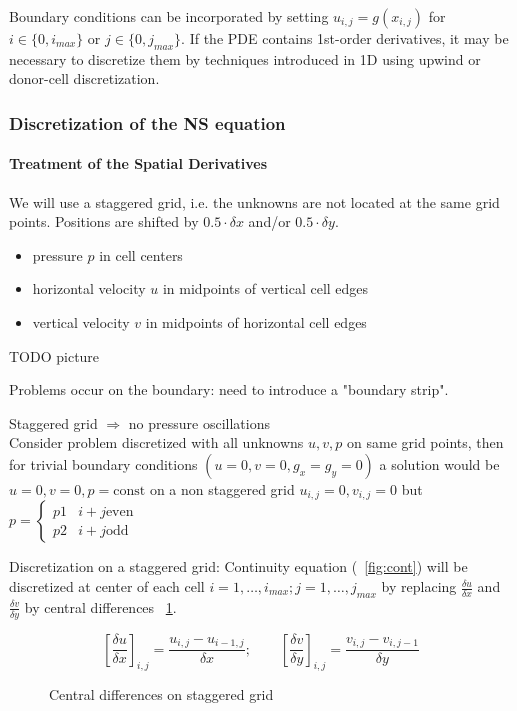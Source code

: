 Boundary conditions can be incorporated by setting $u_{i,j} = g(x_{i,j})$ for $i \in \lbrace 0, i_{max} \rbrace$ or $j \in \lbrace 0,j_{max} \rbrace$. If the PDE contains 1st-order derivatives, it may be necessary to discretize them by techniques introduced in 1D using upwind or donor-cell discretization.

\subsubsection{Discretization of the NS equation}
\paragraph{Treatment of the Spatial Derivatives}
We will use a staggered grid, i.e. the unknowns are not located at the same grid points. Positions are shifted by $0.5 \cdot \delta x$ and/or $0.5 \cdot \delta y$.
\begin{itemize}
	\item pressure $p$ in cell centers
	\item horizontal velocity $u$ in midpoints of vertical cell edges
	\item vertical velocity $v$ in midpoints of horizontal cell edges
\end{itemize}
TODO picture


Problems occur on the boundary: need to introduce a "boundary strip".

Staggered grid $\Rightarrow$ no pressure oscillations\\
Consider problem discretized with all unknowns $u,v,p$ on same grid points, then for trivial boundary conditions $(u = 0, v =0, g_x = g_y = 0)$ a solution would be $u = 0, v = 0, p = \text{const}$ on a non staggered grid $u_{i,j} = 0, v_{i,j} = 0$ but $p = \begin{cases}
p1 & i+j \text{even}\\
p2 & i+j \text{odd}
\end{cases}$

Discretization on a staggered grid: Continuity equation (~\ref{fig:cont}) will be discretized at center of each cell $i = 1, \dots, i_{max}; j = 1, \dots, j_{max}$ by replacing $\frac{\delta u}{\delta x}$ and $\frac{\delta v}{\delta y}$ by central differences ~\ref{fig:dif-cen-stag}.

\begin{figure}[H]
	\centering
	\[ \left[ \frac{\delta u}{\delta x}\right]_{i,j} = \frac{u_{i,j} - u_{i-1,j}}{\delta x}; \qquad  \left[ \frac{\delta v}{\delta y}\right]_{i,j} = \frac{v_{i,j} - v_{i,j-1}}{\delta y} \]
	\renewcommand{\thefigure}{3.16}
	\caption{Central differences on staggered grid}
	\label{fig:dif-cen-stag}
\end{figure}

